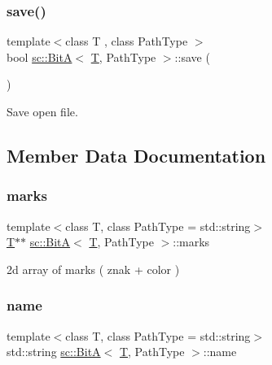 \subsubsection{\texorpdfstring{save()}{save()}}
{\footnotesize\ttfamily template$<$class T , class Path\+Type $>$ \\
bool \mbox{\hyperlink{classsc_1_1_bit_a}{sc\+::\+BitA}}$<$ \mbox{\hyperlink{_keyboard_event_8h_adf1f3edb9115acb0a1e04209b7a9937b}{T}}, Path\+Type $>$\+::save (\begin{DoxyParamCaption}{ }\end{DoxyParamCaption})}



Save open file. 



\subsection{Member Data Documentation}
\mbox{\label{classsc_1_1_bit_a_abf6254d67d78b69385eb9979bff258af}} 
\subsubsection{\texorpdfstring{marks}{marks}}
{\footnotesize\ttfamily template$<$class T, class Path\+Type = std\+::string$>$ \\
\mbox{\hyperlink{_keyboard_event_8h_adf1f3edb9115acb0a1e04209b7a9937b}{T}}$\ast$$\ast$ \mbox{\hyperlink{classsc_1_1_bit_a}{sc\+::\+BitA}}$<$ \mbox{\hyperlink{_keyboard_event_8h_adf1f3edb9115acb0a1e04209b7a9937b}{T}}, Path\+Type $>$\+::marks}



2d array of marks ( znak + color ) 

\mbox{\label{classsc_1_1_bit_a_aa384124759ff1305861c8db25217956c}} 
\subsubsection{\texorpdfstring{name}{name}}
{\footnotesize\ttfamily template$<$class T, class Path\+Type = std\+::string$>$ \\
std\+::string \mbox{\hyperlink{classsc_1_1_bit_a}{sc\+::\+BitA}}$<$ \mbox{\hyperlink{_keyboard_event_8h_adf1f3edb9115acb0a1e04209b7a9937b}{T}}, Path\+Type $>$\+::name}



